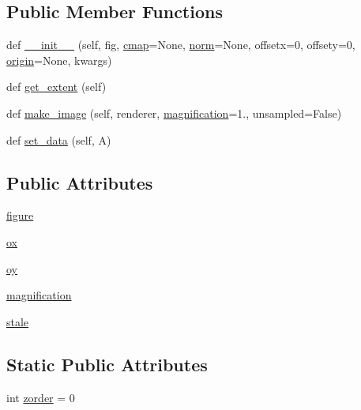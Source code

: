 \subsection*{Public Member Functions}
\begin{DoxyCompactItemize}
\item 
def \hyperlink{classmatplotlib_1_1image_1_1FigureImage_ac9ae5240d06aa46f87c2f2370b01f5d0}{\+\_\+\+\_\+init\+\_\+\+\_\+} (self, fig, \hyperlink{classmatplotlib_1_1cm_1_1ScalarMappable_a3684ebc12a81cc6f2599c0babd1d40af}{cmap}=None, \hyperlink{classmatplotlib_1_1cm_1_1ScalarMappable_a5507985e8c38feaa3d6972f75db09f73}{norm}=None, offsetx=0, offsety=0, \hyperlink{classmatplotlib_1_1image_1_1__ImageBase_aebc786349e152a9dc981ffde5bc39795}{origin}=None, kwargs)
\item 
def \hyperlink{classmatplotlib_1_1image_1_1FigureImage_a1b0fcc58368310d727f3bb55ba9c1ad3}{get\+\_\+extent} (self)
\item 
def \hyperlink{classmatplotlib_1_1image_1_1FigureImage_aee5b4fdf85424dff9f4e63631f0cac9b}{make\+\_\+image} (self, renderer, \hyperlink{classmatplotlib_1_1image_1_1FigureImage_a211a612765ecd47a20728f76be60e50d}{magnification}=1., unsampled=False)
\item 
def \hyperlink{classmatplotlib_1_1image_1_1FigureImage_a674040dedef3061024f684a06307161b}{set\+\_\+data} (self, A)
\end{DoxyCompactItemize}
\subsection*{Public Attributes}
\begin{DoxyCompactItemize}
\item 
\hyperlink{classmatplotlib_1_1image_1_1FigureImage_ae196f46d103b832f83e2962dc706472e}{figure}
\item 
\hyperlink{classmatplotlib_1_1image_1_1FigureImage_a10fd01ccdb92eb88d02907efe3b68cb2}{ox}
\item 
\hyperlink{classmatplotlib_1_1image_1_1FigureImage_af8891c6c298d778562b29a955aac8c2d}{oy}
\item 
\hyperlink{classmatplotlib_1_1image_1_1FigureImage_a211a612765ecd47a20728f76be60e50d}{magnification}
\item 
\hyperlink{classmatplotlib_1_1image_1_1FigureImage_a9f24359e4785b2fd92df321f95df7f7f}{stale}
\end{DoxyCompactItemize}
\subsection*{Static Public Attributes}
\begin{DoxyCompactItemize}
\item 
int \hyperlink{classmatplotlib_1_1image_1_1FigureImage_a8a6bdabcb214e560d3ada45a4d00d29d}{zorder} = 0
\end{DoxyCompactItemize}


